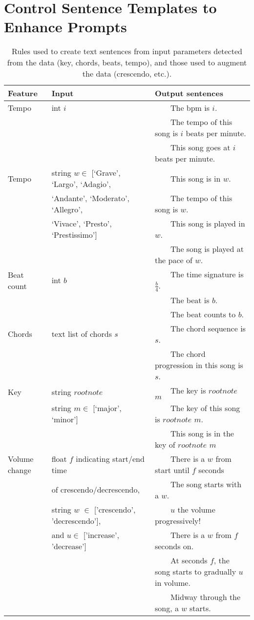 \documentclass[11pt]{article}
\newcommand{\tabitem}{~~\llap{\textbullet}~~}
\begin{document}
\clearpage
\FloatBarrier
\section{Control Sentence Templates to Enhance Prompts}
\label{sec:controlcaptions}

\begin{table}[h] \footnotesize
\caption{Rules used to create text sentences from input parameters detected from the data (key, chords, beats, tempo), and those used to augment the data (crescendo, etc.). }
\begin{tabular}{@{}lll@{}}
\toprule
Feature & Input   & Output sentences  \\
\midrule
Tempo & int $i$ & \tabitem The bpm is $i$. \\
& & \tabitem The tempo of this song is $i$ beats per minute.\\
& & \tabitem This song goes at $i$ beats per minute.\\
\midrule
Tempo & string $w \in $ [`Grave', `Largo', `Adagio', & \tabitem This song is in $w$.\\
& `Andante', `Moderato', `Allegro',  & \tabitem The tempo of this song is $w$.\\
& `Vivace', `Presto', `Prestissimo']& \tabitem This song is played in $w$.\\
& & \tabitem The song is played at the pace of $w$.\\
\midrule
Beat count& int $b$ & \tabitem The time signature is $\frac{b}{4}$.\\
& & \tabitem The beat is $b$.\\
& & \tabitem The beat counts to $b$.\\
\midrule
Chords&  text list of chords $s$ & \tabitem The chord sequence is $s$. \\
& & \tabitem The chord progression in this song is $s$.\\
\midrule
Key& string $rootnote$  & \tabitem The key is $rootnote$ $m$\\
& string $m \in$ [`major', `minor'] & \tabitem The key of this song is $rootnote$ $m$.\\
& & \tabitem This song is in the key of $rootnote$ $m$\\
\midrule
Volume change& float $f$ indicating start/end time  & \tabitem There is a $w$ from start until $f$ seconds \\
& of crescendo/decrescendo, & \tabitem The song starts with a $w$.\\
& string $w$ $\in$ ['crescendo', 'decrescendo'], & \tabitem $u$ the volume progressively!\\
& and $u \in $ ['increase', 'decrease'] & \tabitem There is a $w$ from $f$ seconds on.\\
& & \tabitem At seconds $f$, the song starts to gradually $u$ in volume.\\
& & \tabitem Midway through the song, a $w$ starts.\\
\bottomrule
\end{tabular}


\end{table}
\end{document}
